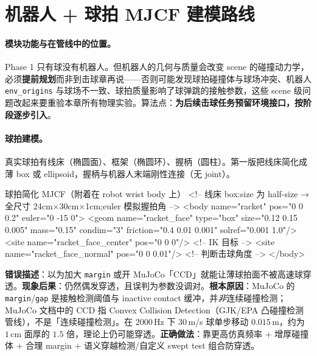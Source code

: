\section{机器人 + 球拍 MJCF 建模路线}
\label{sec:rlmc-tennis-robot}

\paragraph{模块功能与在管线中的位置。}Phase 1 只有球没有机器人。但机器人的几何与质量会改变 scene 的碰撞动力学，必须\textbf{提前规划}而非到击球章再说——否则可能发现球拍碰撞体与球场冲突、机器人 \verb|env_origins| 与球场不一致、球拍质量影响了球弹跳的接触参数，这些 scene 级问题改起来要重验本章所有物理实验。算法点：\textbf{为后续击球任务预留环境接口，按阶段逐步引入}。

\paragraph{球拍建模。}真实球拍有线床（椭圆面）、框架（椭圆环）、握柄（圆柱）。第一版把线床简化成薄 box 或 ellipsoid，握柄与机器人末端刚性连接（无 joint）。

\begin{codebox}[text]{球拍简化 MJCF（附着在 robot wrist body 上）}
<!-- 线床 box:size 为 half-size → 全尺寸 24cm×30cm×1cm;euler 模拟握拍角 -->
<body name="racket" pos="0 0 0.2" euler="0 -15 0">
  <geom name="racket_face" type="box" size="0.12 0.15 0.005"
        mass="0.15" condim="3" friction="0.4 0.01 0.001" solref="0.001 1.0"/>
  <site name="racket_face_center" pos="0 0 0"/>     <!-- IK 目标 -->
  <site name="racket_face_normal" pos="0 0 0.01"/>  <!-- 判断击球角度 -->
</body>
\end{codebox}

\begin{pitfall}
\textbf{错误描述}：以为加大 \verb|margin| 或开 MuJoCo「CCD」就能让薄球拍面不被高速球穿透。\textbf{现象后果}：仍然偶发穿透，且误判为参数没调对。\textbf{根本原因}：MuJoCo 的 \texttt{margin}/\allowbreak\texttt{gap} 是接触检测阈值与 inactive contact 缓冲，并\emph{非}连续碰撞检测；MuJoCo 文档中的 CCD 指 Convex Collision Detection（GJK/EPA 凸碰撞检测管线），不是「连续碰撞检测」。在 $2000$\,Hz 下 $30$\,m/s 球单步移动 $0.015$\,m，约为 $1$\,cm 面厚的 $1.5$ 倍，理论上仍可能穿透。\textbf{正确做法}：靠更高仿真频率 $+$ 增厚碰撞体 $+$ 合理 margin $+$ 语义穿越检测/自定义 swept test 组合防穿透。
\end{pitfall}

